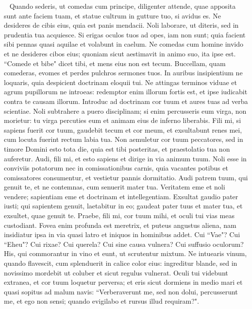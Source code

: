\begin{biblechapter}   
\verse Quando sederis, ut comedas cum principe, diligenter attende, quae apposita sunt ante faciem tuam, 
\verse et statue cultrum in gutture tuo, si avidus es. 
\verse Ne desideres de cibis eius, quia est panis mendacii. 
\verse Noli laborare, ut diteris, sed in prudentia tua acquiesce. 
\verse Si erigas oculos tuos ad opes, iam non sunt; quia facient sibi pennas quasi aquilae et volabunt in caelum. 
\verse Ne comedas cum homine invido et ne desideres cibos eius; 
\verse quoniam sicut aestimavit in animo suo, ita ipse est. “Comede et bibe" dicet tibi, et mens eius non est tecum. 
\verse Buccellam, quam comederas, evomes et perdes pulchros sermones tuos. 
\verse In auribus insipientium ne loquaris, quia despicient doctrinam eloquii tui. 
\verse Ne attingas terminos viduae et agrum pupillorum ne introeas: 
\verse redemptor enim illorum fortis est, et ipse iudicabit contra te causam illorum. 
\verse Introduc ad doctrinam cor tuum et aures tuas ad verba scientiae. 
\verse Noli subtrahere a puero disciplinam; si enim percusseris eum virga, non morietur: 
\verse tu virga percuties eum et animam eius de inferno liberabis. 
\verse Fili mi, si sapiens fuerit cor tuum, gaudebit tecum et cor meum, 
\verse et exsultabunt renes mei, cum locuta fuerint rectum labia tua. 
\verse Non aemuletur cor tuum peccatores, sed in timore Domini esto tota die, 
\verse quia est tibi posteritas, et praestolatio tua non auferetur. 
\verse Audi, fili mi, et esto sapiens et dirige in via animum tuum. 
\verse Noli esse in conviviis potatorum nec in comissationibus carnis, 
\verse quia vacantes potibus et comissatores consumentur, et vestietur pannis dormitatio. 
\verse Audi patrem tuum, qui genuit te, et ne contemnas, cum senuerit mater tua. 
\verse Veritatem eme et noli vendere; sapientiam eme et doctrinam et intellegentiam. 
\verse Exsultat gaudio pater iusti; qui sapientem genuit, laetabitur in eo; 
\verse gaudeat pater tuus et mater tua, et exsultet, quae genuit te. 
\verse Praebe, fili mi, cor tuum mihi, et oculi tui vias meas custodiant. 
\verse Fovea enim profunda est meretrix, et puteus angustus aliena, 
\verse nam insidiatur ipsa in via quasi latro et iniquos in hominibus addet. 
\verse Cui “Vae"? Cui “Eheu"? Cui rixae? Cui querela? Cui sine causa vulnera? Cui suffusio oculorum? 
\verse His, qui commorantur in vino et eunt, ut scrutentur mixtum. 
\verse Ne intuearis vinum, quando flavescit, cum splenduerit in calice color eius: ingreditur blande, 
\verse sed in novissimo mordebit ut coluber et sicut regulus vulnerat. 
\verse Oculi tui videbunt extranea, et cor tuum loquetur perversa; 
\verse et eris sicut dormiens in medio mari et quasi sopitus ad malum navis: 
\verse “Verberaverunt me, sed non dolui, percusserunt me, et ego non sensi; quando evigilabo et rursus illud requiram?". 
\end{biblechapter}


